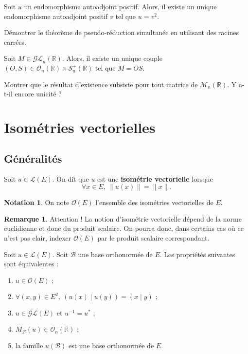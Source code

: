 \documentclass[french]{article}
\newcommand{\R}{\mathbb{R}}
\newcommand{\st}{^*}
\newcommand{\inv}{^{-1}}
\theoremstyle{plain}
\theoremstyle{definition}
\newtheorem*{rmq}{Remarque}
\newtheorem*{notation}{Notation}
\theoremstyle{remark}
\begin{document}
\begin{thm}
	Soit $u$ un endomorphisme autoadjoint positif. Alors, il existe un unique endomorphisme autoadjoint positif $v$ tel que $u=v^2$.
\end{thm}

\begin{exo}
	Démontrer le théorème de pseudo-réduction simultanée en utilisant des racines carrées.
\end{exo}

\begin{cor}
	Soit $M\in\mathcal{GL}_n(\R)$. Alors, il existe un unique couple $(O,S)\in\mathcal{O}_n(\R)\times\mathcal{S}_n^{+}(\R)$ tel que $M=OS$.
\end{cor}

\begin{exo}
	Montrer que le résultat d'existence subsiste pour tout matrice de $\mathcal{M}_n(\R)$. Y a-t-il encore unicité ?
\end{exo}

\section{Isométries vectorielles}

\subsection{Généralités}

\begin{dfn}
	Soit $u\in\mathcal{L}(E)$. On dit que $u$ est une \textbf{isométrie vectorielle} lorsque $$\forall x\in E,\ \lVert u(x)\rVert=\lVert x\rVert.$$
\end{dfn}

\begin{notation}
	On note $\mathcal{O}(E)$ l'ensemble des isométries vectorielles de $E$.
\end{notation}

\begin{rmq}
	Attention ! La notion d'isométrie vectorielle dépend de la norme euclidienne et donc du produit scalaire. On pourra donc, dans certains cas où ce n'est pas clair, indexer $\mathcal{O}(E)$ par le produit scalaire correspondant.
\end{rmq}

\begin{prop}
	Soit $u\in\mathcal{L}(E)$. Soit $\mathcal{B}$ une base orthonormée de $E$. Les propriétés suivantes sont équivalentes : \begin{enumerate}[label=(\roman*)]
		\item $u\in\mathcal{O}(E)$ ;
		\item $\forall (x,y)\in E^2,\ \left(u(x)\mid u(y)\right)=(x\mid y)$ ;
		\item $u\in\mathcal{GL}(E)$ et $u\inv=u\st$ ;
		\item $M_\mathcal{B}(u)\in\mathcal{O}_n(\R)$ ;
		\item la famille $u(\mathcal{B})$ est une base orthonormée de $E$.
	\end{enumerate}
\end{prop}
\end{document}
